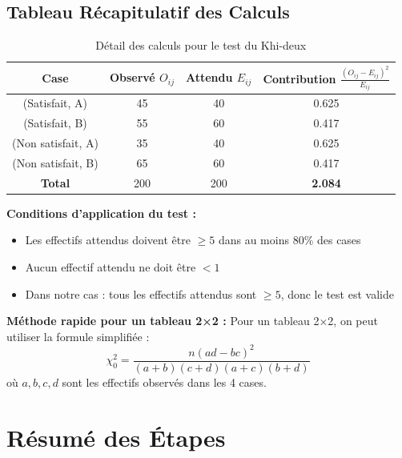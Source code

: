 \documentclass[11pt,a4paper]{article}
\newcommand{\chideux}{\chi^2}
\begin{document}
\subsection{Tableau Récapitulatif des Calculs}

\begin{table}[h]
\centering
\small
\begin{tabular}{|c|c|c|c|}
\hline
\textbf{Case} & \textbf{Observé $O_{ij}$} & \textbf{Attendu $E_{ij}$} & \textbf{Contribution $\frac{(O_{ij}-E_{ij})^2}{E_{ij}}$} \\
\hline
(Satisfait, A) & 45 & 40 & 0.625 \\
\hline
(Satisfait, B) & 55 & 60 & 0.417 \\
\hline
(Non satisfait, A) & 35 & 40 & 0.625 \\
\hline
(Non satisfait, B) & 65 & 60 & 0.417 \\
\hline
\textbf{Total} & 200 & 200 & \textbf{2.084} \\
\hline
\end{tabular}
\caption{Détail des calculs pour le test du Khi-deux}
\end{table}

\begin{attentionbox}
\textbf{Conditions d'application du test :}
\begin{itemize}
    \item Les effectifs attendus doivent être $\geq 5$ dans au moins 80\% des cases
    \item Aucun effectif attendu ne doit être $< 1$
    \item Dans notre cas : tous les effectifs attendus sont $\geq 5$, donc le test est valide
\end{itemize}
\end{attentionbox}

\begin{astucebox}
\textbf{Méthode rapide pour un tableau 2×2 :}
Pour un tableau 2×2, on peut utiliser la formule simplifiée :
$$\chideux_0 = \frac{n(ad - bc)^2}{(a+b)(c+d)(a+c)(b+d)}$$
où $a, b, c, d$ sont les effectifs observés dans les 4 cases.
\end{astucebox}

\newpage

\section{Résumé des Étapes}
\end{document}
